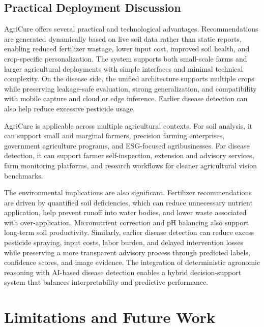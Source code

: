 \documentclass[conference]{IEEEtran}
\begin{document}
\subsection{Practical Deployment Discussion}
AgriCure offers several practical and technological advantages. Recommendations are generated dynamically based on live soil data rather than static reports, enabling reduced fertilizer wastage, lower input cost, improved soil health, and crop-specific personalization. The system supports both small-scale farms and larger agricultural deployments with simple interfaces and minimal technical complexity. On the disease side, the unified architecture supports multiple crops while preserving leakage-safe evaluation, strong generalization, and compatibility with mobile capture and cloud or edge inference. Earlier disease detection can also help reduce excessive pesticide usage.

AgriCure is applicable across multiple agricultural contexts. For soil analysis, it can support small and marginal farmers, precision farming enterprises, government agriculture programs, and ESG-focused agribusinesses. For disease detection, it can support farmer self-inspection, extension and advisory services, farm monitoring platforms, and research workflows for cleaner agricultural vision benchmarks.

The environmental implications are also significant. Fertilizer recommendations are driven by quantified soil deficiencies, which can reduce unnecessary nutrient application, help prevent runoff into water bodies, and lower waste associated with over-application. Micronutrient correction and pH balancing also support long-term soil productivity. Similarly, earlier disease detection can reduce excess pesticide spraying, input costs, labor burden, and delayed intervention losses while preserving a more transparent advisory process through predicted labels, confidence scores, and image evidence. The integration of deterministic agronomic reasoning with AI-based disease detection enables a hybrid decision-support system that balances interpretability and predictive performance.

\section{Limitations and Future Work}
\end{document}
